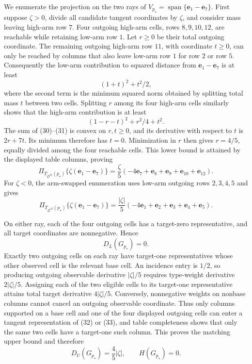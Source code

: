 We enumerate the projection on the two rays of \(V_{p_\star}=\operatorname{span}\{\mathbf e_1-\mathbf e_7\}\).  First suppose \(\zeta>0\), divide all candidate tangent coordinates by \(\zeta\), and consider mass leaving high-arm row \(7\).  Four outgoing high-arm cells, rows \(8,9,10,12\), are reachable while retaining low-arm row \(1\).  Let \(r\geq0\) be their total outgoing coordinate.  The remaining outgoing high-arm row \(11\), with coordinate \(t\geq0\), can only be reached by columns that also leave low-arm row \(1\) for row \(2\) or row \(5\).  Consequently the low-arm contribution to squared distance from \(\mathbf e_1-\mathbf e_7\) is at least
\[
(1+t)^2+t^2/2,
\tag{30}
\]
where the second term is the minimum squared norm obtained by splitting total mass \(t\) between two cells.  Splitting \(r\) among its four high-arm cells similarly shows that the high-arm contribution is at least
\[
(1-r-t)^2+r^2/4+t^2.
\tag{31}
\]
The sum of (30)--(31) is convex on \(r,t\geq0\), and its derivative with respect to \(t\) is \(2r+7t\).  Its minimum therefore has \(t=0\).  Minimization in \(r\) then gives \(r=4/5\), equally divided among the four reachable cells.  This lower bound is attained by the displayed table columns, proving
\[
\Pi_{T_{\mathfrak O^{32}}(p_\star)}
\{\zeta(\mathbf e_1-\mathbf e_7)\}
=\frac{\zeta}{5}(-4\mathbf e_7+\mathbf e_8+\mathbf e_9+\mathbf e_{10}+\mathbf e_{12}).
\tag{32}
\]
For \(\zeta<0\), the arm-swapped enumeration uses low-arm outgoing rows \(2,3,4,5\) and gives
\[
\Pi_{T_{\mathfrak O^{32}}(p_\star)}
\{\zeta(\mathbf e_1-\mathbf e_7)\}
=\frac{|\zeta|}{5}(-4\mathbf e_1+\mathbf e_2+\mathbf e_3+\mathbf e_4+\mathbf e_5).
\tag{33}
\]

On either ray, each of the four outgoing cells has a target-zero representative, and all target coordinates are nonnegative.  Hence
\[
D_L(G_{p_\star})=0.
\tag{34}
\]
Exactly two outgoing cells on each ray have target-one representatives whose other observed cell is the relevant base cell.  An incidence entry is \(1/2\), so producing outgoing observable derivative \(|\zeta|/5\) requires type-weight derivative \(2|\zeta|/5\).  Assigning each of the two eligible cells to its target-one representative attains total target derivative \(4|\zeta|/5\).  Conversely, nonnegative weights on nonbase columns cannot cancel an outgoing observable coordinate.  Thus only columns supported on a base cell and one of the four displayed outgoing cells can enter a tangent representation of (32) or (33), and table completeness shows that only the same two cells have a target-one such column.  This proves the matching upper bound and therefore
\[
D_U(G_{p_\star})=\frac45|\zeta|,
\qquad H(G_{p_\star})=0.
\tag{35}
\]

